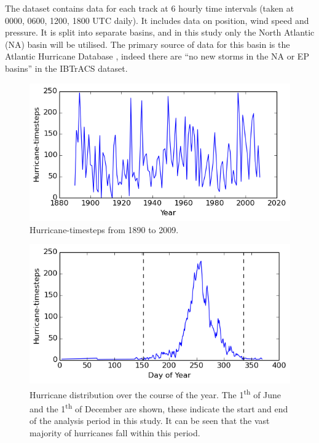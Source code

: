 \documentclass[pdftex,12pt,a4paper]{report}
\newcommand{\ts}{\textsuperscript}
\begin{document}
The dataset contains data for each track at 6 hourly time intervals (taken at 0000, 0600, 1200, 1800
UTC daily). It includes data on position, wind speed and pressure. It is split into separate basins,
and in this study only the North Atlantic (NA) basin will be utilised. The primary source of data
for this basin is the Atlantic Hurricane Database \parencite[HURDAT;][]{jarvinen1984tropical}, indeed
there are ``no new storms in the NA or EP basins'' in the IBTrACS dataset.

\begin{figure}[hm!]
    \centering
    \includegraphics[width=\textwidth]{figures/hurr_per_year}
    \caption{Hurricane-timesteps from 1890 to 2009.}
    \label{fig:hurr_per_year}
\end{figure}

\begin{figure}[hm!]
    \centering
    \includegraphics[width=\textwidth]{figures/yearly_hurr_dist}
    \caption{Hurricane distribution over the course of the year. The 1\ts{th} of June and the
    1\ts{th} of December are shown, these indicate the start and end of the analysis period in this
study. It can be seen that the vast majority of hurricanes fall within this period.}
    \label{fig:yearly_hurr_dist}
\end{figure}
\end{document}
